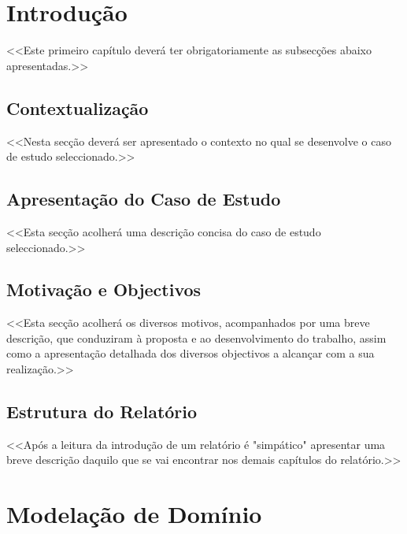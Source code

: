 \documentclass[a4paper,12pt]{scrreprt}
\begin{document}
\listoftables

\pagebreak





\chapter{Introdução}
    <<Este primeiro capítulo deverá ter obrigatoriamente as subsecções abaixo apresentadas.>>
    \section{Contextualização}
        <<Nesta secção deverá ser apresentado o contexto no qual se desenvolve o caso de estudo seleccionado.>>
    \section{Apresentação do Caso de Estudo}
        <<Esta secção acolherá uma descrição concisa do caso de estudo seleccionado.>>
    \section{Motivação e Objectivos}
        <<Esta secção acolherá os diversos motivos, acompanhados por uma breve descrição, que conduziram à proposta e ao desenvolvimento do trabalho, assim como a apresentação detalhada dos diversos objectivos a alcançar com a sua realização.>>
    \section{Estrutura do Relatório}
        <<Após a leitura da introdução de um relatório é "simpático" apresentar uma breve descrição daquilo que se vai encontrar nos demais capítulos do relatório.>>


\chapter{Modelação de Domínio}
\end{document}

